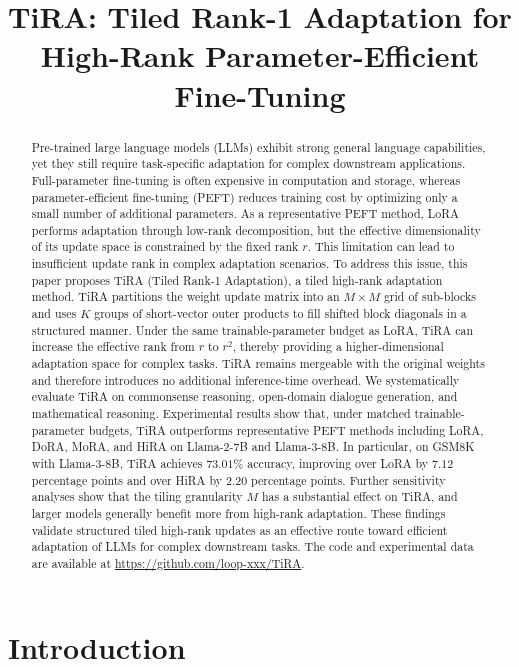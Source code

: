 \documentclass[a4paper,11pt]{article}
\title{TiRA: Tiled Rank-1 Adaptation for High-Rank Parameter-Efficient Fine-Tuning}
\author{}
\date{}
\begin{document}
\pagestyle{empty}
\maketitle

\begin{abstract}
Pre-trained large language models (LLMs) exhibit strong general language capabilities, yet they still require task-specific adaptation for complex downstream applications. Full-parameter fine-tuning is often expensive in computation and storage, whereas parameter-efficient fine-tuning (PEFT) reduces training cost by optimizing only a small number of additional parameters. As a representative PEFT method, LoRA performs adaptation through low-rank decomposition, but the effective dimensionality of its update space is constrained by the fixed rank $r$. This limitation can lead to insufficient update rank in complex adaptation scenarios. To address this issue, this paper proposes TiRA (Tiled Rank-1 Adaptation), a tiled high-rank adaptation method. TiRA partitions the weight update matrix into an $M\times M$ grid of sub-blocks and uses $K$ groups of short-vector outer products to fill shifted block diagonals in a structured manner. Under the same trainable-parameter budget as LoRA, TiRA can increase the effective rank from $r$ to $r^2$, thereby providing a higher-dimensional adaptation space for complex tasks. TiRA remains mergeable with the original weights and therefore introduces no additional inference-time overhead. We systematically evaluate TiRA on commonsense reasoning, open-domain dialogue generation, and mathematical reasoning. Experimental results show that, under matched trainable-parameter budgets, TiRA outperforms representative PEFT methods including LoRA, DoRA, MoRA, and HiRA on Llama-2-7B and Llama-3-8B. In particular, on GSM8K with Llama-3-8B, TiRA achieves $73.01\%$ accuracy, improving over LoRA by $7.12$ percentage points and over HiRA by $2.20$ percentage points. Further sensitivity analyses show that the tiling granularity $M$ has a substantial effect on TiRA, and larger models generally benefit more from high-rank adaptation. These findings validate structured tiled high-rank updates as an effective route toward efficient adaptation of LLMs for complex downstream tasks. The code and experimental data are available at \url{https://github.com/loop-xxx/TiRA}.
\end{abstract}

\section{Introduction}
\end{document}
